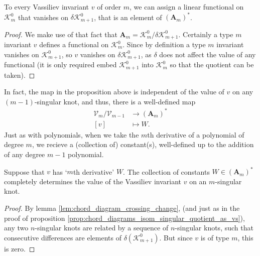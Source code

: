         \begin{proposition}
                To every Vassiliev invariant \(v\) of order \(m\), we can assign a linear functional on \(\mathcal{K}^{0}_{m}\) that vanishes on \(\delta \mathcal{K}^{0}_{m + 1}\), that is an element of \((\mathbf{A}_{m})^{\ast}\).
        \end{proposition}
        \begin{proof}
                We make use of that fact that \(\mathbf{A}_{m} = \mathcal{K}^{0}_{m} / \delta\mathcal{K}^{0}_{m + 1}\). Certainly a type \(m\) invariant \(v\) defines a functional on \(\mathcal{K}^{0}_{m}\). Since by definition a type \(m\) invariant vanishes on \(\mathcal{K}^{0}_{m + 1}\), so \(v\) vanishes on \(\delta\mathcal{K}^{0}_{m + 1}\), as \(\delta\) does not affect the value of any functional (it is only required embed \(\mathcal{K}^{0}_{m + 1}\) into \(\mathcal{K}^{0}_{m}\) so that the quotient can be taken).
        \end{proof}

        In fact, the map in the proposition above is independent of the value of \(v\) on any \((m - 1)\)-singular knot, and thus, there is a well-defined map
        \begin{align*}
                \mathcal{V}_{m} / \mathcal{V}_{m - 1} &\longrightarrow (\mathbf{A}_{m})^{\ast} \\
                [v]             & \longmapsto W.
        \end{align*}
        Just as with polynomials, when we take the \(m\)th derivative of a polynomial of degree \(m\), we recieve a (collection of) constant(s), well-defined up to the addition of any degree \(m - 1\) polynomial.

        \begin{proposition}
                Suppose that \(v\) has `\(m\)th derivative' \(W\). The collection of constants \(W \in (\mathbf{A}_{m})^{\ast}\) completely determines the value of the Vassiliev invariant \(v\) on an \(m\)-singular knot.
        \end{proposition}

        \begin{proof}
                By lemma \ref{lem:chord_diagram_crossing_change}, (and just as in the proof of proposition \ref{prop:chord_diagrams_isom_singular_quotient_as_vs}), any two \(n\)-singular knots are related by a sequence of \(n\)-singular knots, such that consecutive differences are elements of \(\delta(\mathcal{K}^{0}_{m + 1})\). But since \(v\) is of type \(m\), this is zero.
        \end{proof}


